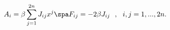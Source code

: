 \begin{equation}
\label{fluxgodelS}
A_i = \beta \sum_{j=1}^{2n} J_{ij} x^j
\spa
F_{ij} = - 2\beta J_{ij}
\ \ , \ \ i,j=1,...,2n.
\end{equation}

